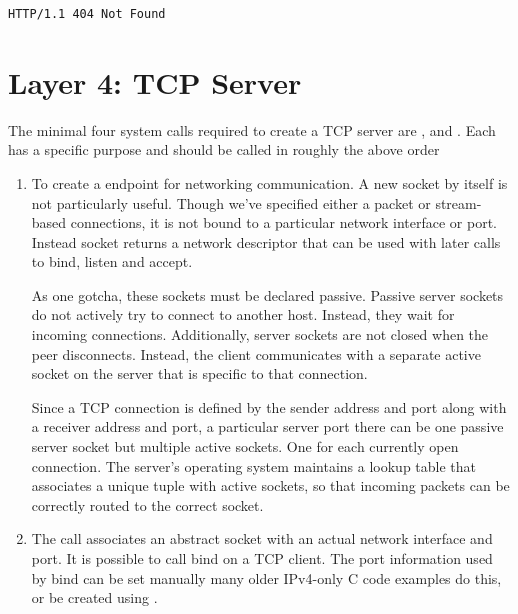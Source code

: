 \begin{lstlisting}
HTTP/1.1 404 Not Found
\end{lstlisting}


\section{Layer 4: TCP Server}

The minimal four system calls required to create a TCP server are ,   and .
Each has a specific purpose and should be called in roughly the above order

\begin{enumerate}

  \item {}

  To create a endpoint for networking communication.
  A new socket by itself is not particularly useful.
  Though we've specified either a packet or stream-based connections, it is not bound to a particular network interface or port.
  Instead socket returns a network descriptor that can be used with later calls to bind, listen and accept.

  As one gotcha, these sockets must be declared passive.
  Passive server sockets do not actively try to connect to another host.
  Instead, they wait for incoming connections.
  Additionally, server sockets are not closed when the peer disconnects.
  Instead, the client communicates with a separate active socket on the server that is specific to that connection.

  Since a TCP connection is defined by the sender address and port along with a receiver address and port, a particular server port there can be one passive server socket but multiple active sockets.
  One for each currently open connection.
  The server's operating system maintains a lookup table that associates a unique tuple with active sockets, so that incoming packets can be correctly routed to the correct socket.

  \item {}

  The  call associates an abstract socket with an actual network interface and port.
  It is possible to call bind on a TCP client.
  The port information used by bind can be set manually many older IPv4-only C code examples do this, or be created using .


\end{enumerate}
